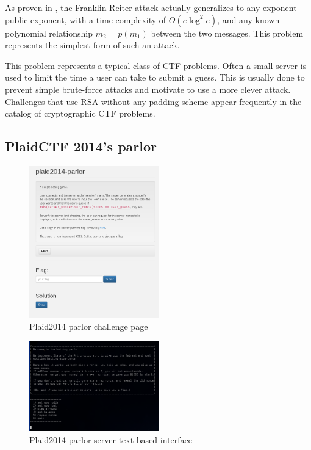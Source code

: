 As proven in \cite{coppersmith1996low}, the Franklin-Reiter attack actually
generalizes to any exponent public exponent, with a time complexity of
$O(e\log^2{e})$, and any known polynomial relationship $m_2=p(m_1)$
between the two messages. This problem represents the simplest form of such an
attack.

This problem represents a typical class of CTF problems. Often a small server is
used to limit the time a user can take to submit a guess. This is usually done
to prevent simple brute-force attacks and motivate to use a more clever attack.
Challenges that use RSA without any padding scheme appear frequently in the
catalog of cryptographic CTF problems.

\subsection{PlaidCTF 2014's parlor}

\begin{figure}[!ht]
\centering
\includegraphics[width=0.5\textwidth]{parlor_page.png}
\caption{Plaid2014 parlor challenge page}\label{fig:parlor_page}
\end{figure}

\begin{figure}[!ht]
\centering
\includegraphics[width=0.5\textwidth]{parlor_interface.png}
\caption{Plaid2014 parlor server text-based interface}\label{fig:parlor_interface}
\end{figure}


